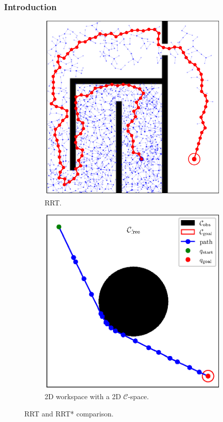 \documentclass{beamer}
\begin{document}
\begin{frame}
	\frametitle{Introduction}	
	\begin{figure}[!ht]
		\centering  
		\begin{subfigure}[b]{0.45\textwidth}
			\includegraphics[width=\textwidth]{figChap3/RRT_maze7748i119w.pdf}
			\caption{RRT.} 
		\end{subfigure}
		\begin{subfigure}[b]{0.45\textwidth}
			\includegraphics[width=\linewidth]{figChap2/ConfigSpace.eps}
			\caption{2D workspace with a 2D $\mathcal{C}$-space.}
		\end{subfigure} 
		\caption{RRT and RRT* comparison.} 
	  \end{figure}
\end{frame}	
\end{document}
